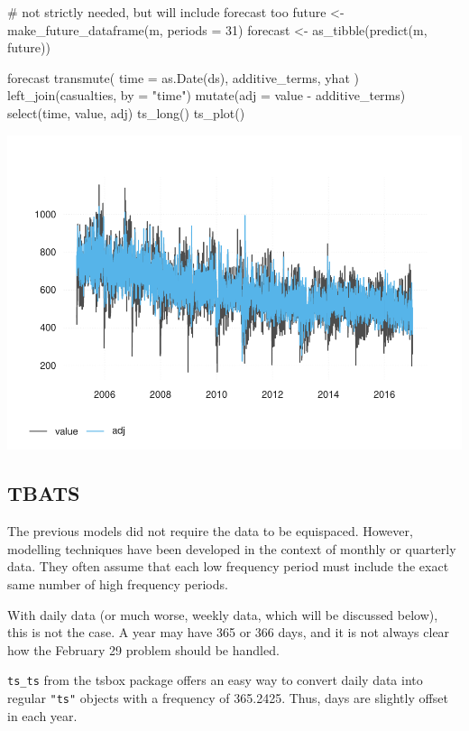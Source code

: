 \begin{Schunk}
\begin{Sinput}
# not strictly needed, but will include forecast too
future <- make_future_dataframe(m, periods = 31)
forecast <- as_tibble(predict(m, future))

forecast %
  transmute(
    time = as.Date(ds),
    additive_terms,
    yhat
  ) %
  left_join(casualties, by = "time") %
  mutate(adj = value - additive_terms) %
  select(time, value, adj) %
  ts_long() %
  ts_plot()
\end{Sinput}

\includegraphics[width=1\linewidth]{overview_files/figure-latex/prophet-components-1} \end{Schunk}

\hypertarget{tbats}{%
\subsection{TBATS}\label{tbats}}

The previous models did not require the data to be equispaced. However,
modelling techniques have been developed in the context of monthly or
quarterly data. They often assume that each low frequency period must
include the exact same number of high frequency periods.

With daily data (or much worse, weekly data, which will be discussed
below), this is not the case. A year may have 365 or 366 days, and it is
not always clear how the February 29 problem should be handled.

\texttt{ts\_ts} from the tsbox package offers an easy way to convert
daily data into regular \texttt{"ts"} objects with a frequency of
365.2425. Thus, days are slightly offset in each year.

